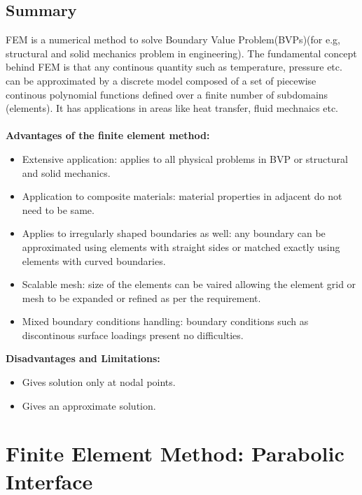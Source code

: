 \documentclass{report}
\numberwithin{equation}{chapter}
\begin{document}
\section{Summary}
\begin{spacing}{1.5}
FEM is a numerical method to solve Boundary Value Problem(BVPs)(for e.g, structural and solid mechanics problem in engineering). The fundamental concept behind FEM is that any continous quantity such as temperature, pressure etc. can be approximated by a discrete model composed of a set of piecewise continous polynomial functions defined over a finite number of subdomains (elements). It has applications in areas like heat transfer, fluid mechnaics etc.\\ \\
\textbf{Advantages of the finite element method:}\\
\begin{itemize}
  \item Extensive application: applies to all physical problems in BVP or structural and solid mechanics.
  \item Application to composite materials: material properties in adjacent do not need to be same. 
  \item Applies to irregularly shaped boundaries as well: any boundary can be approximated using elements with straight sides or matched exactly using elements with curved boundaries.
  \item Scalable mesh: size of the elements can be vaired allowing the element grid or mesh to be expanded or refined as per the requirement.
  \item Mixed boundary conditions handling: boundary conditions such as discontinous surface loadings present no difficulties.
\end{itemize}
\textbf{Disadvantages and Limitations:}\\
\begin{itemize}
\item Gives solution only at nodal points.
\item Gives an approximate solution.
\end{itemize}
\end{spacing}


\chapter{Finite Element Method: Parabolic Interface}
\end{document}
